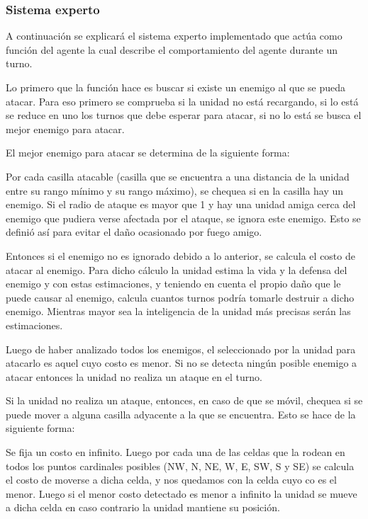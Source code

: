 \subsubsection{Sistema experto}

A continuación se explicará el sistema experto implementado que actúa como función del agente la cual describe el comportamiento del agente durante un turno.

Lo primero que la función hace es buscar si existe un enemigo al que se pueda atacar. Para eso primero se comprueba si la unidad no está recargando, si lo está se reduce en uno los turnos que debe esperar para atacar, si no lo está se busca el mejor enemigo para atacar. 
 
El mejor enemigo para atacar se determina de la siguiente forma:
 
Por cada casilla atacable (casilla que se encuentra a una distancia de la unidad entre su rango mínimo y su rango máximo), se chequea si en la casilla hay un enemigo. Si el radio de ataque es mayor que 1 y hay una unidad amiga cerca del enemigo que pudiera verse afectada por el ataque, se ignora este enemigo. Esto se definió así para evitar el daño ocasionado por fuego amigo.
 
Entonces si el enemigo no es ignorado debido a lo anterior, se calcula el costo de atacar al enemigo. Para dicho cálculo la unidad estima la vida y la defensa del enemigo y con estas estimaciones, y teniendo en cuenta el propio da\~{n}o que le puede causar al enemigo, calcula cuantos turnos podría tomarle destruir a dicho enemigo. Mientras mayor sea la inteligencia de la unidad más precisas serán las estimaciones.

Luego de haber analizado todos los enemigos, el seleccionado por la unidad para atacarlo es aquel cuyo costo es menor. Si no se detecta ningún posible enemigo a atacar entonces la unidad no realiza un ataque en el turno.
 
Si la unidad no realiza un ataque, entonces, en caso de que se móvil, chequea si se puede mover a alguna casilla adyacente a la que se encuentra. Esto se hace de la siguiente forma:
 
Se fija un costo en infinito. Luego por cada una de las celdas que la rodean en todos los puntos cardinales posibles (NW, N, NE, W, E, SW, S y SE) se calcula el costo de moverse a dicha celda, y nos quedamos con la celda cuyo co es el menor. Luego si el menor costo detectado es menor a infinito la unidad se mueve a dicha celda en caso contrario la unidad mantiene su posición. 
 
